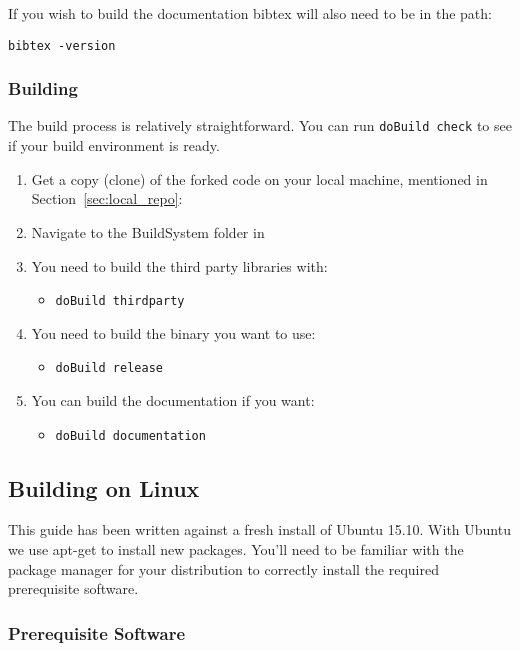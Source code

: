 If you wish to build the documentation bibtex will also need to be in the path:

\texttt{bibtex -version}

\subsubsection{Building \CNAME}

The build process is relatively straightforward. You can run \texttt{doBuild check} to see if your build environment is ready.

\begin{enumerate}
  \item Get a copy (clone) of the forked code on your local machine, mentioned in Section~\ref{sec:local_repo}:
  \item Navigate to the BuildSystem folder in 
  \item You need to build the third party libraries with:
  \begin{itemize}
    \item \texttt{doBuild thirdparty}
  \end{itemize}
  \item You need to build the binary you want to use:
  \begin{itemize}
    \item \texttt{doBuild release}
  \end{itemize}
  \item You can build the documentation if you want:
  \begin{itemize}
    \item \texttt{doBuild documentation}
  \end{itemize}
\end{enumerate}

\subsection{Building on Linux}

This guide has been written against a fresh install of Ubuntu 15.10. With Ubuntu we use apt-get to install new packages. You’ll need to be familiar with the package manager for your distribution to correctly install the required prerequisite software.

\subsubsection{Prerequisite Software}

